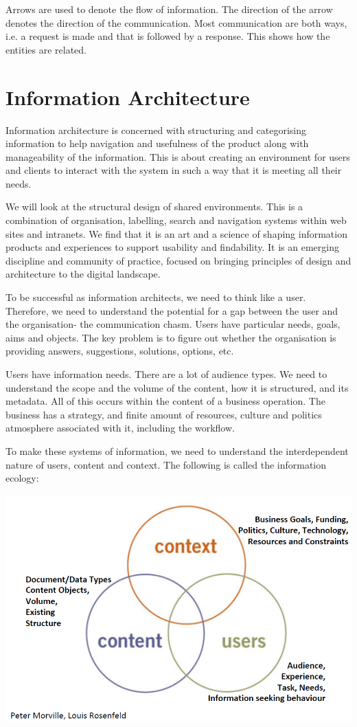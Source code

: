 \documentclass[a4paper, openany]{memoir}
\begin{document}
Arrows are used to denote the flow of information. The direction of the arrow denotes the direction of the communication. Most communication are both ways, i.e. a request is made and that is followed by a response. This shows how the entities are related.
\newpage

\section{Information Architecture}
Information architecture is concerned with structuring and categorising information to help navigation and usefulness of the product along with manageability of the information. This is about creating an environment for users and clients to interact with the system in such a way that it is meeting all their needs.

We will look at the structural design of shared environments. This is a combination of organisation, labelling, search and navigation systems within web sites and intranets. We find that it is an art and a science of shaping information products and experiences to support usability and findability. It is an emerging discipline and community of practice, focused on bringing principles of design and architecture to the digital landscape.

To be successful as information  architects, we need to think like a user. Therefore, we need to understand the potential for a gap between the user and the organisation- the communication chasm. Users have particular needs, goals, aims and objects. The key problem is to figure out whether the organisation is providing answers, suggestions, solutions, options, etc.

Users have information needs. There are a lot of audience types. We need to understand the scope and the volume of the content, how it is structured, and its metadata. All of this occurs within the content of a business operation. The business has a strategy, and finite amount of resources, culture and politics atmosphere associated with it, including the workflow.

To make these systems of information, we need to understand the interdependent nature of users, content and context. The following is called the information ecology:
\begin{center}
    \includegraphics[scale=0.6]{src/L8I3.PNG}
\end{center}
\end{document}
